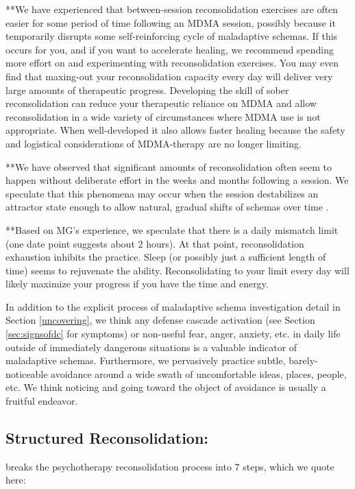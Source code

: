 \documentclass[12pt,letterpaper]{book}
\begin{document}
**We have experienced that between-session reconsolidation exercises are often easier for some period of time following an MDMA session, possibly because it temporarily disrupts some self-reinforcing cycle of maladaptive schemas. If this occurs for you, and if you want to accelerate healing, we recommend spending more effort on and experimenting with reconsolidation exercises. You may even find that maxing-out your reconsolidation capacity every day will deliver very large amounts of therapeutic progress. Developing the skill of sober reconsolidation can reduce your therapeutic reliance on MDMA and allow reconsolidation in a wide variety of circumstances where MDMA use is not appropriate. When well-developed it also allows faster healing because the safety and logistical considerations of MDMA-therapy are no longer limiting.

**We have observed that significant amounts of reconsolidation often seem to happen without deliberate effort in the weeks and months following a session. We speculate that this phenomena may occur when the session destabilizes an attractor state enough to allow natural, gradual shifts of schemas over time \cite{hayes2020complex}.

**Based on MG's experience, we speculate that there is a daily mismatch limit (one date point suggests about 2 hours). At that point, reconsolidation exhaustion inhibits the practice. Sleep (or possibly just a sufficient length of time) seems to rejuvenate the ability. Reconsolidating to your limit every day will likely maximize your progress if you have the time and energy.



In addition to the explicit process of maladaptive schema investigation detail in Section \ref{uncovering}, we think any defense cascade activation (see Section \ref{sec:signsofdc} for symptoms) or non-useful fear, anger, anxiety, etc. in daily life outside of immediately dangerous situations is a valuable indicator of maladaptive schemas. Furthermore, we pervasively practice subtle, barely-noticeable avoidance around a wide swath of uncomfortable ideas, places, people, etc. We think noticing and going toward the object of avoidance is usually a fruitful endeavor.

\subsection*{Structured Reconsolidation:}
\textcite{eckerUnlocking} breaks the psychotherapy reconsolidation process into 7 steps, which we quote here:
\end{document}
